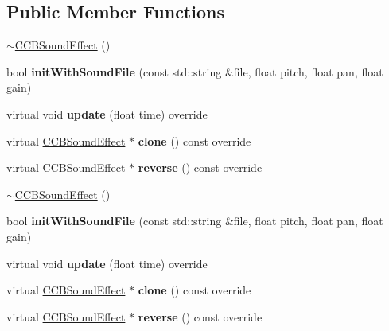\subsection*{Public Member Functions}
\begin{DoxyCompactItemize}
\item 
\hyperlink{classcocosbuilder_1_1CCBSoundEffect_aa7814bf8a50e936adf6354a1a87006ca}{$\sim$\+C\+C\+B\+Sound\+Effect} ()
\item 
\mbox{\label{classcocosbuilder_1_1CCBSoundEffect_a2bcbe26c57b1b399b1d3537cded3727f}} 
bool {\bfseries init\+With\+Sound\+File} (const std\+::string \&file, float pitch, float pan, float gain)
\item 
\mbox{\label{classcocosbuilder_1_1CCBSoundEffect_ae3db3f248729150d4aee00fab4103fd3}} 
virtual void {\bfseries update} (float time) override
\item 
\mbox{\label{classcocosbuilder_1_1CCBSoundEffect_a9413aa929b5fa2ecb2bc6296068475fa}} 
virtual \hyperlink{classcocosbuilder_1_1CCBSoundEffect}{C\+C\+B\+Sound\+Effect} $\ast$ {\bfseries clone} () const override
\item 
\mbox{\label{classcocosbuilder_1_1CCBSoundEffect_ab45fa6de717744b2ed1c745fcacffd16}} 
virtual \hyperlink{classcocosbuilder_1_1CCBSoundEffect}{C\+C\+B\+Sound\+Effect} $\ast$ {\bfseries reverse} () const override
\item 
\hyperlink{classcocosbuilder_1_1CCBSoundEffect_aa7814bf8a50e936adf6354a1a87006ca}{$\sim$\+C\+C\+B\+Sound\+Effect} ()
\item 
\mbox{\label{classcocosbuilder_1_1CCBSoundEffect_a2bcbe26c57b1b399b1d3537cded3727f}} 
bool {\bfseries init\+With\+Sound\+File} (const std\+::string \&file, float pitch, float pan, float gain)
\item 
\mbox{\label{classcocosbuilder_1_1CCBSoundEffect_ad96110b91eeffaabc5073abac8c50aa2}} 
virtual void {\bfseries update} (float time) override
\item 
\mbox{\label{classcocosbuilder_1_1CCBSoundEffect_a45e3e0a9fb6d9af34a037fee7d4e0fe9}} 
virtual \hyperlink{classcocosbuilder_1_1CCBSoundEffect}{C\+C\+B\+Sound\+Effect} $\ast$ {\bfseries clone} () const override
\item 
\mbox{\label{classcocosbuilder_1_1CCBSoundEffect_aeda08a413c0d190a4ee59503317a42bf}} 
virtual \hyperlink{classcocosbuilder_1_1CCBSoundEffect}{C\+C\+B\+Sound\+Effect} $\ast$ {\bfseries reverse} () const override
\end{DoxyCompactItemize}
